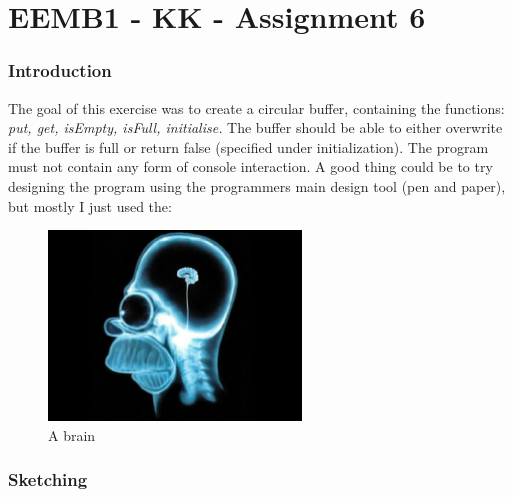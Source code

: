 

\part*{EEMB1 - KK - Assignment 6}
\section{Introduction}
The goal of this exercise was to create a circular buffer, containing the functions: \textit{put, get, isEmpty, isFull, initialise.}
The buffer should be able to either overwrite if the buffer is full or return false (specified under initialization). The program
must not contain any form of console interaction.
A good thing could be to try designing the program using the programmers main design tool (pen and paper), but mostly I just used the:
\\ \newline
\begin{figure}[h!]		%
	\begin{centering}
 		\includegraphics[width=0.6\textwidth]{brain.jpg}
		\caption{A brain}
	\end{centering}
\end{figure}

\newpage
\section{Sketching}
